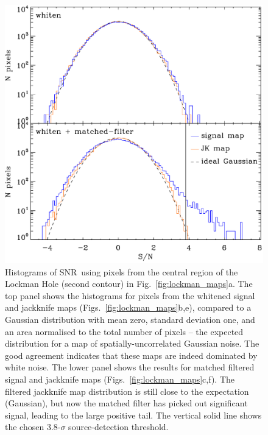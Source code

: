 \documentclass[useAMS,usenatbib,nofootinbib]{mn2e}
\newcommand{\snr}{SNR}
\begin{document}
\begin{figure}
\centering
\includegraphics[width=\linewidth]{lockman_hist.pdf}
\caption{Histograms of \snr\ using pixels from the central region of
  the Lockman Hole (second contour) in
  Fig.~\ref{fig:lockman_maps}a. The top panel shows the histograms for
  pixels from the whitened signal and jackknife maps
  (Figs.~\ref{fig:lockman_maps}b,e), compared to a Gaussian
  distribution with mean zero, standard deviation one, and an area
  normalised to the total number of pixels -- the expected
  distribution for a map of spatially-uncorrelated Gaussian noise. The
  good agreement indicates that these maps are indeed dominated by
  white noise. The lower panel shows the results for matched filtered
  signal and jackknife maps (Figs.~\ref{fig:lockman_maps}c,f). The
  filtered jackknife map distribution is still close to the
  expectation (Gaussian), but now the matched filter has picked out
  significant signal, leading to the large positive tail. The vertical
  solid line shows the chosen 3.8-$\sigma$ source-detection
  threshold.}
\label{fig:lockman_hist}
\end{figure}
\end{document}
